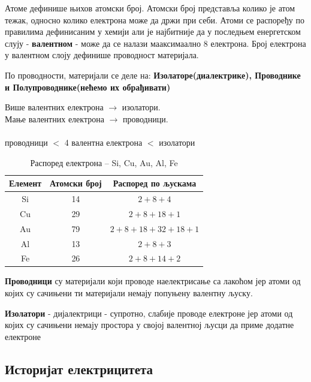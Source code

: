 \documentclass{article}
\begin{document}
Атоме  дефинише њихов атомски број. Атомски број представља колико је атом тежак, односно колико електрона може да држи при  себи. Атоми се распоређу по правилима дефинисаним у хемији али је најбитније да у последњем енергетском слују - \textbf{валентном} - може да се налази мааксимаално 8 електрона. Број електрона у валентном слоју дефинише проводност материјала.

По проводности, материјали се деле на: \textbf{Изолаторе(диалектрике), Проводнике и Полупроводнике(нећемо их обрађивати)}

\begin{tcolorbox}[colback=blue!5, colframe=blue!60, title=Важно]

    Више валентних електрона $\rightarrow$ изолатори.\\
    Мање валентних електрона $\rightarrow$ проводници.\\
\\
    проводници $<$ 4 валентна електрона $<$ изолатори 

\end{tcolorbox}

\begin{table}[H]
    \centering
    \begin{tabular}{|c|c|c|}
        \hline
        Елемент & Атомски број & Распоред по љускама \\
        \hline
        Si & 14 & $2+8+4$ \\
        Cu & 29 & $2+8+18+1$ \\
        Au & 79 & $2+8+18+32+18+1$ \\
        Al & 13 & $2+8+3$ \\
        Fe & 26 & $2+8+14+2$ \\
        \hline
    \end{tabular}
    \caption{Распоред електрона -- Si, Cu, Au, Al, Fe}
    \label{tab:metali}
\end{table}

\textbf{Проводници} су материјали који проводе наелектрисање са лакоћом јер атоми од којих су сачињени ти материјали немају попуњену валентну љуску.

\textbf{Изолатори} - дијалектрици - супротно, слабије проводе електроне јер атоми од којих су сачињени немају простора у својој валентној љусци да приме додатне електроне



\subsection{Историјат електрицитета}
\end{document}
